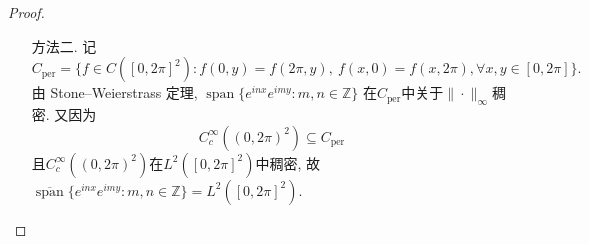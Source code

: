\begin{proof}
\begin{itemize}
\begin{proof}
        设$h\in L^2(X\times Y,\mu\times\nu)$满足
        $$\langle h,e_nf_m\rangle_{L^2(X\times Y)}=0,
        \qquad \forall m,n\in\N.$$
        由 Tonelli 定理, 对几乎所有$x\in X$,
        都有$h(x,\cdot)\in L^2(Y,\nu)$. 对每个$m$, 在这些$x$上定义
        $$a_m(x)=\int_Yh(x,y)\overline{f_m(y)}\,d\nu(y),$$
        并在余下的零测集上令$a_m(x)=0$.
        由 Cauchy--Schwarz 不等式,
        $$|a_m(x)|^2\leq\int_Y|h(x,y)|^2\,d\nu(y),$$
        故$a_m\in L^2(X,\mu)$. 再由 Fubini 定理, 对所有$n$都有
        $$\langle a_m,e_n\rangle_{L^2(X)}
        =\langle h,e_nf_m\rangle_{L^2(X\times Y)}=0.$$
        因为$\{e_n\}$是标准正交基, 所以$a_m=0\ a.e.$, 即存在零测集$N_m$, 满足$ a_m(x)=0,\forall x\in X\backslash N_m$. 
        由于$m$只有可数多个, 可以取同一个零测集$N=\cup_m N_m\subseteq X$, 使得对任意
        $x\in X\setminus N$和任意$m\in\N$, 都有
        $$\langle h(x,\cdot),f_m\rangle_{L^2(Y)}=a_m(x)=0.$$
        再由$\{f_m\}$的完全性, 对任意$x\in X\setminus N$, 在$L^2(Y)$中有
        $h(x,\cdot)=0$. 于是由 Tonelli 定理,
        $$\|h\|_{L^2(X\times Y)}^2
        =\int_X\|h(x,\cdot)\|_{L^2(Y)}^2\,d\mu(x)=0.$$
        从而$h=0\ a.e.$, 完全性得证.
    \end{proof}
    \item[方法二.]
    记
    $$C_{\mathrm{per}}
    =\{f\in C([0,2\pi]^2):
    f(0,y)=f(2\pi,y),\ f(x,0)=f(x,2\pi),
    \forall x,y\in[0,2\pi]\}.$$
    由 Stone--Weierstrass 定理, $\operatorname{span}\{e^{inx}e^{imy}:m,n\in\mathbb Z\}$
    在$C_{\mathrm{per}}$中关于$\|\cdot\|_\infty$稠密.
    又因为
    $$C_c^\infty((0,2\pi)^2)\subseteq C_{\mathrm{per}}$$
    且$C_c^\infty((0,2\pi)^2)$在$L^2([0,2\pi]^2)$中稠密,
    故$\overline{\operatorname{span}}{\{e^{inx}e^{imy}:m,n\in\mathbb Z\}}=L^2([0,2\pi]^2)$.
    \end{itemize}
\end{proof}